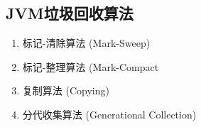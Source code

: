 \documentclass[../../../interview-questions.tex]{subfiles}
\begin{document}
\subsection{JVM垃圾回收算法}

\begin{enumerate}
    \item{标记-清除算法 (Mark-Sweep)}
    \item{标记-整理算法 (Mark-Compact}
    \item {复制算法 (Copying)}
    \item {分代收集算法 (Generational Collection)}
\end{enumerate}
\end{document}
